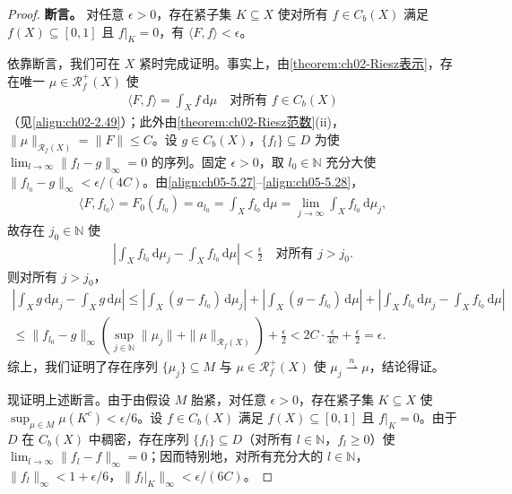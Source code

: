 \documentclass[../../main.tex]{subfiles}%
\begin{document}
\begin{proof}
\textbf{断言。} 对任意 $\epsilon>0$，存在紧子集 $K\subseteq X$ 使对所有 $f\in C_b(X)$ 满足 $f(X)\subseteq[0,1]$ 且 $f|_K=0$，有 $\langle F,f\rangle<\epsilon$。

依靠断言，我们可在 $X$ 紧时完成证明。事实上，由\cref{theorem:ch02-Riesz表示}，存在唯一 $\mu\in\mathscr{R}^+_f(X)$ 使
\begin{align}
\langle F,f\rangle=\int_X f\,\mathrm{d}\mu
\quad\text{对所有 }f\in C_b(X)\label{align:ch05-5.28}
\end{align}
（见\eqref{align:ch02-2.49}）；此外由\cref{theorem:ch02-Riesz范数}(ii)，$\|\mu\|_{\mathscr{R}_f(X)}=\|F\|\leqslant C$。设 $g\in C_b(X)$，$\{f_l\}\subseteq D$ 为使 $\lim_{l\to\infty}\|f_l-g\|_\infty=0$ 的序列。固定 $\epsilon>0$，取 $l_0\in\mathbb{N}$ 充分大使 $\|f_{l_0}-g\|_\infty<\epsilon/(4C)$。由\eqref{align:ch05-5.27}–\eqref{align:ch05-5.28}，
\begin{align*}
\langle F,f_{l_0}\rangle=F_0(f_{l_0})=a_{l_0}
=\int_X f_{l_0}\,\mathrm{d}\mu
=\lim_{j\to\infty}\int_X f_{l_0}\,\mathrm{d}\mu_j,
\end{align*}
故存在 $j_0\in\mathbb{N}$ 使
\begin{align*}
\left|\int_X f_{l_0}\,\mathrm{d}\mu_j-\int_X f_{l_0}\,\mathrm{d}\mu\right|<\frac{\epsilon}{2}
\quad\text{对所有 }j>j_0.
\end{align*}
则对所有 $j>j_0$，
\begin{align*}
\left|\int_X g\,\mathrm{d}\mu_j-\int_X g\,\mathrm{d}\mu\right|
\leqslant\left|\int_X(g-f_{l_0})\,\mathrm{d}\mu_j\right|
+\left|\int_X(g-f_{l_0})\,\mathrm{d}\mu\right|
+\left|\int_X f_{l_0}\,\mathrm{d}\mu_j-\int_X f_{l_0}\,\mathrm{d}\mu\right|\\
\leqslant\|f_{l_0}-g\|_\infty\left(\sup_{j\in\mathbb{N}}\|\mu_j\|+\|\mu\|_{\mathscr{R}_f(X)}\right)+\frac{\epsilon}{2}
<2C\cdot\frac{\epsilon}{4C}+\frac{\epsilon}{2}=\epsilon.
\end{align*}
综上，我们证明了存在序列 $\{\mu_j\}\subseteq M$ 与 $\mu\in\mathscr{R}^+_f(X)$ 使 $\mu_j\stackrel{n}{\rightharpoonup}\mu$，结论得证。

现证明上述断言。由于由假设 $M$ 胎紧，对任意 $\epsilon>0$，存在紧子集 $K\subseteq X$ 使 $\sup_{\mu\in M}\mu(K^c)<\epsilon/6$。设 $f\in C_b(X)$ 满足 $f(X)\subseteq[0,1]$ 且 $f|_K=0$。由于 $D$ 在 $C_b(X)$ 中稠密，存在序列 $\{f_l\}\subseteq D$（对所有 $l\in\mathbb{N}$，$f_l\geqslant0$）使 $\lim_{l\to\infty}\|f_l-f\|_\infty=0$；因而特别地，对所有充分大的 $l\in\mathbb{N}$，$\|f_l\|_\infty<1+\epsilon/6$，$\|f_l|_K\|_\infty<\epsilon/(6C)$。


\end{proof}
\end{document}
